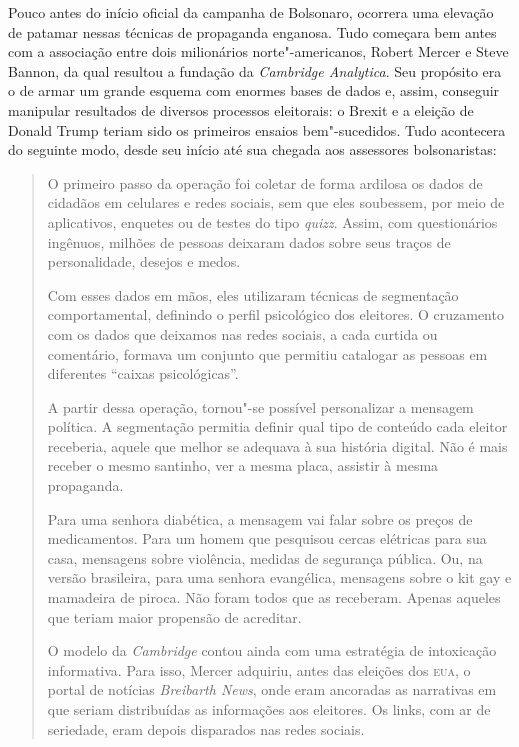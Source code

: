 Pouco antes do início oficial da campanha de Bolsonaro, ocorrera uma
elevação de patamar nessas técnicas de propaganda enganosa. Tudo
começara bem antes com a associação entre dois milionários
norte"-americanos, Robert Mercer e Steve Bannon, da qual resultou a
fundação da \emph{Cambridge Analytica}. Seu propósito era o de armar um
grande esquema com enormes bases de dados e, assim, conseguir manipular
resultados de diversos processos eleitorais: o Brexit e a eleição de
Donald Trump teriam sido os primeiros ensaios bem"-sucedidos. Tudo
acontecera do seguinte modo, desde seu início até sua chegada aos
assessores bolsonaristas:

\begin{quote}
O primeiro passo da operação foi coletar de forma ardilosa os dados de
cidadãos em celulares e redes sociais, sem que eles soubessem, por meio
de aplicativos, enquetes ou de testes do tipo \emph{quizz}. Assim, com
questionários ingênuos, milhões de pessoas deixaram dados sobre seus
traços de personalidade, desejos e medos.

Com esses dados em mãos, eles utilizaram técnicas de segmentação
comportamental, definindo o perfil psicológico dos eleitores. O
cruzamento com os dados que deixamos nas redes sociais, a cada curtida
ou comentário, formava um conjunto que permitiu catalogar as pessoas em
diferentes ``caixas psicológicas''.

A partir dessa operação, tornou"-se possível personalizar a mensagem
política. A segmentação permitia definir qual tipo de conteúdo cada
eleitor receberia, aquele que melhor se adequava à sua história digital.
Não é mais receber o mesmo santinho, ver a mesma placa, assistir à mesma
propaganda.

Para uma senhora diabética, a mensagem vai falar sobre os preços de
medicamentos. Para um homem que pesquisou cercas elétricas para sua
casa, mensagens sobre violência, medidas de segurança pública. Ou, na
versão brasileira, para uma senhora evangélica, mensagens sobre o kit
gay e mamadeira de piroca. Não foram todos que as receberam. Apenas
aqueles que teriam maior propensão de acreditar.

O modelo da \emph{Cambridge} contou ainda com uma estratégia de
intoxicação informativa. Para isso, Mercer adquiriu, antes das eleições
dos \textsc{eua}, o portal de notícias \emph{Breibarth News}, onde eram ancoradas
as narrativas em que seriam distribuídas as informações aos eleitores.
Os links, com ar de seriedade, eram depois disparados nas redes sociais.


\end{quote}
